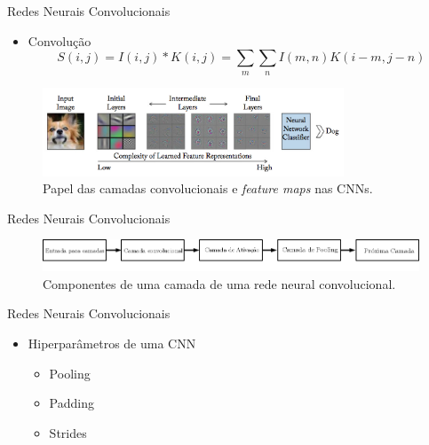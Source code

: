 \begin{frame}{Redes Neurais Convolucionais}
   \ \  \\[0.1cm]
   \begin{itemize}
     \item Convolução
     \begin{equation}
      S(i,j) = I(i,j)*K(i,j) = \sum_{m}\sum_{n}I(m,n)K(i-m,j-n)\label{eq:conv_img}
     \end{equation}
   \end{itemize}
   \begin{figure}[!h]
   	\centering
   	\caption{Papel das camadas convolucionais e \emph{feature maps} nas CNNs.}
   	\label{fig:convolutions}
   	\includegraphics[width=0.8\textwidth]{./img/fundamenta/convolutions}
   \end{figure}
\end{frame}

\begin{frame}{Redes Neurais Convolucionais}
   \ \  \\[0.1cm]
   \begin{figure}
   	\centering
   	\caption{Componentes de uma camada de uma rede neural convolucional.}
   	\label{fig:cnn_camada}
   	\includegraphics[width=\textwidth]{img/cnn_camada_ipe.png}
   \end{figure}
\end{frame}

\begin{frame}{Redes Neurais Convolucionais}
   \ \  \\[0.1cm]
   \begin{itemize}
     \item Hiperparâmetros de uma CNN
     \begin{itemize}
       \item Pooling
       \item Padding
       \item Strides
     \end{itemize}
   \end{itemize}
\end{frame}

